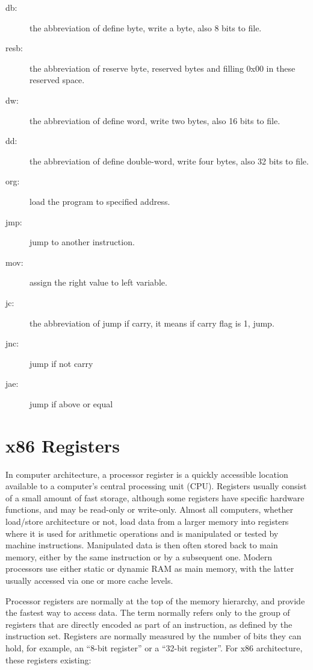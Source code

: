 \documentclass{swfcthesis}
\begin{document}
\begin{description}
\item[db:] the abbreviation of define byte, write a byte, also 8 bits to file.
\item[resb:] the abbreviation of reserve byte, reserved bytes and filling 0x00 in these reserved space.
\item[dw:] the abbreviation of define word, write two bytes, also 16 bits to file.
\item[dd:] the abbreviation of define double-word, write four bytes, also 32 bits to file.
\item[org:] load the program to specified address.
\item[jmp:] jump to another instruction.
\item[mov:] assign the right value to left variable.
\item[jc:] the abbreviation of jump if carry, it means if carry flag is 1, jump.
\item[jnc:] jump if not carry
\item[jae:] jump if above or equal
\end{description}

\section{x86 Registers}
\label{sec:register}

In computer architecture, a processor register is a quickly accessible location available
to a computer's central processing unit (CPU). Registers usually consist of a small amount
of fast storage, although some registers have specific hardware functions, and may be
read-only or write-only.  Almost all computers, whether load/store architecture or not,
load data from a larger memory into registers where it is used for arithmetic operations
and is manipulated or tested by machine instructions. Manipulated data is then often
stored back to main memory, either by the same instruction or by a subsequent one. Modern
processors use either static or dynamic RAM as main memory, with the latter usually
accessed via one or more cache levels.

Processor registers are normally at the top of the memory hierarchy, and provide the
fastest way to access data. The term normally refers only to the group of registers that
are directly encoded as part of an instruction, as defined by the instruction
set. Registers are normally measured by the number of bits they can hold, for example, an
``8-bit register'' or a ``32-bit register''. For x86 architecture, these registers existing:
\end{document}

